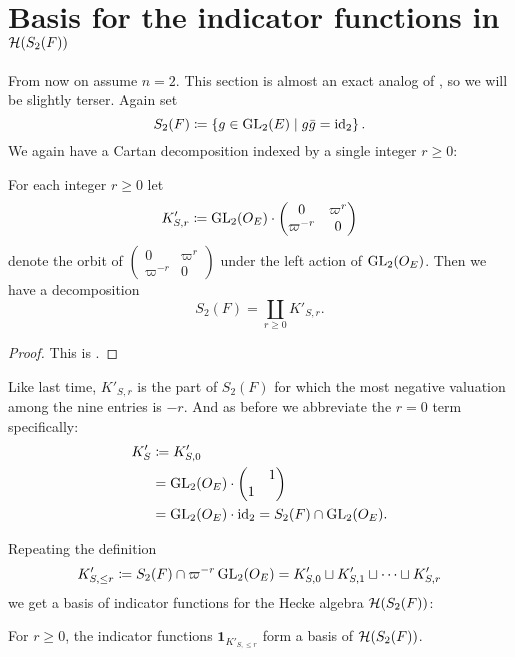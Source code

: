 \section{Basis for the indicator functions in $\HH(S_2(F))$}
\label{sec:hecke_basis_FJ}
From now on assume $n = 2$.
This section is almost an exact analog of ,
so we will be slightly terser.
Again set
\[ S_2(F) \coloneqq \left\{ g \in \operatorname{GL}_2(E) \mid g \bar{g} = \operatorname{id}_2 \right\}. \]
We again have a Cartan decomposition indexed by a single integer $r \ge 0$:
\begin{lemma}
  For each integer $r \ge 0$ let
  \[ K'_{S,r} \coloneqq \operatorname{GL}_2(O_E) \cdot
    \begin{pmatrix} 0 & \varpi^r \\ \varpi^{-r} & 0 \end{pmatrix} \]
  denote the orbit of
  $\begin{pmatrix} 0 & \varpi^r \\ \varpi^{-r} & 0 \end{pmatrix}$
  under the left action of $\operatorname{GL}_2(O_E)$.
  Then we have a decomposition
  \[ S_2(F) = \coprod_{r \geq 0} K'_{S,r}. \]
\end{lemma}
\begin{proof}
  This is \cite[Equation (7.1.7) and (7.1.8)]{ref:AFLspherical}.
\end{proof}

Like last time, $K'_{S,r}$ is the part of $S_2(F)$
for which the most negative valuation among the nine entries is $-r$.
And as before we abbreviate the $r = 0$ term specifically:
\begin{align*}
  K'_S
  &\coloneqq K'_{S,0} \\
  &= \operatorname{GL}_2(O_E) \cdot \begin{pmatrix} & 1 \\ 1 \end{pmatrix} \\
  &= \operatorname{GL}_2(O_E) \cdot \operatorname{id}_2 = S_2(F) \cap \operatorname{GL}_2(O_E).
\end{align*}

Repeating the definition
\[ K'_{S, \le r} \coloneqq S_2(F) \cap \varpi^{-r} \operatorname{GL}_2(O_E)
  = K'_{S,0} \sqcup K'_{S,1} \sqcup \dots \sqcup K'_{S,r} \]
we get a basis of indicator functions for the Hecke algebra $\HH(S_2(F))$:
\begin{corollary}
  [Basis of $\HH(S_2(F))$]
  For $r \ge 0$, the indicator functions $\mathbf{1}_{K'_{S, \le r}}$
  form a basis of $\HH(S_2(F))$.
\end{corollary}

